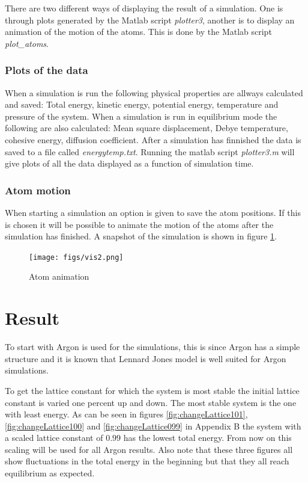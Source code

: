 \documentclass[12pt,a4paper]{article}
\begin{document}
There are two different ways of displaying the result of a simulation. One is through plots generated by the Matlab script \emph{plotter3}, another is to display an animation of the motion of the atoms. This is done by the Matlab script \emph{plot\_atoms}.

\subsubsection{Plots of the data}
When a simulation is run the following physical properties are allways calculated and saved: Total energy, kinetic energy, potential energy, temperature and pressure of the system. When a simulation is run in equilibrium mode the following are also calculated: Mean square displacement, Debye temperature, cohesive energy, diffusion coefficient. After a simulation has finnished the data is saved to a file called \emph{energytemp.txt}. Running the matlab script \emph{plotter3.m} will give plots of all the data displayed as a function of simulation time. 

\subsubsection{Atom motion}
When starting a simulation an option is given to save the atom positions. If this is chosen it will be possible to animate the motion of the atoms after the simulation has finished. A snapshot of the simulation is shown in figure \ref{fig:animation}.

\begin{figure}[h]
\begin{center}
\texttt{[image: figs/vis2.png]}
\caption{\small Atom animation
\label{fig:animation}}
\end{center}
\end{figure}


\newpage
\section{Result}
\label{sec:Result}

To start with Argon is used for the simulations, this is since Argon  has a simple structure and it is known that Lennard Jones model is well suited for Argon simulations.

To get the lattice constant for which the system is most stable the initial lattice constant is varied one percent up and down. The most stable system is the one with least energy. As can be seen in figures \ref{fig:changeLattice101}, \ref{fig:changeLattice100} and \ref{fig:changeLattice099} in Appendix B the system with a scaled lattice constant of \(0.99\) has the lowest total energy. From now on this scaling will be used for all Argon results. Also note that these three figures all show fluctuations in the total energy in the beginning but that they all reach equilibrium as expected.
\end{document}
